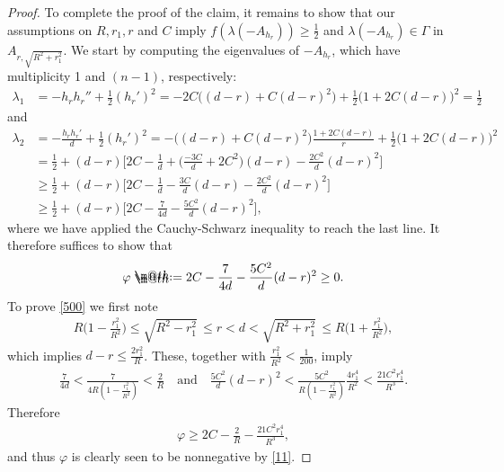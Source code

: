 \documentclass[12pt]{article}
\makeatletter
\numberwithin{equation}{section}
\theoremstyle{plain}
\theoremstyle{definition}
\renewcommand{\phi}{\varphi}
\newcommand*{\defeq}{\mathrel{\rlap{%
			\raisebox{0.3ex}{$\m@th\cdot$}}%
		\raisebox{-0.3ex}{$\m@th\cdot$}}%
	=}
\makeatother
\begin{document}
\begin{proof}
	To complete the proof of the claim, it remains to show that our assumptions on $R, r_1, r$ and $C$ imply $f(\lambda(-A_{h_{r}})) \geq \frac{1}{2}$ and $\lambda(-A_{h_{r}})\in\Gamma$ in $A_{r, \sqrt{R^2 + r_1^2}}$. We start by computing the eigenvalues of $-A_{h_{r}}$, which have multiplicity 1 and $(n-1)$, respectively: 
	\begin{align*}
	\lambda_1 & = -h_{r}h_{r}'' + \frac{1}{2}(h_{r}')^2 = -2C\big((d-r) + C(d-r)^2\big) + \frac{1}{2}\big(1+2C(d-r)\big)^2 = \frac{1}{2}
	\end{align*}
	and
	\begin{align*}
	\lambda_2 & = -\frac{h_{r}h_{r}'}{d} + \frac{1}{2}(h_{r}')^2   = -\big((d-r) + C(d-r)^2\big)\frac{1+2C(d-r)}{r}+ \frac{1}{2}\big(1+2C(d-r)\big)^2 \nonumber \\
	& = \frac{1}{2} + (d-r)\bigg[2C -\frac{1}{d} + \Big(\frac{-3C}{d} + 2C^2\Big)(d-r) - \frac{2C^2}{d}(d-r)^2\bigg] \nonumber \\
	& \geq \frac{1}{2} + (d-r)\bigg[2C -\frac{1}{d} -\frac{3C}{d}(d-r) - \frac{2C^2}{d}(d-r)^2\bigg] \nonumber \\
	& \geq \frac{1}{2} + (d-r)\bigg[2C -\frac{7}{4d} - \frac{5C^2}{d}(d-r)^2\bigg],
	\end{align*}
	where we have applied the Cauchy-Schwarz inequality to reach the last line. It therefore suffices to show that
	\begin{align}\label{500}
	\phi \defeq 2C -\frac{7}{4d} - \frac{5C^2}{d}(d-r)^2  \geq 0. 
	\end{align} 
	To prove \eqref{500} we first note
	\begin{align*}
	R\bigg(1-\frac{r_1^2}{R^2}\bigg) \leq \sqrt{R^2 - r_1^2}\, \leq r < d < \sqrt{R^2 + r_1^2} \, \leq R\bigg(1+\frac{r_1^2}{R^2}\bigg),
	\end{align*} 
	which implies $d-r \leq \frac{2r_1^2}{R}$. These, together with $\frac{r_1^2}{R^2} < \frac{1}{200}$, imply
	\begin{align*}
	\frac{7}{4d} < \frac{7}{4R(1-\frac{r_1^2}{R^2})} < \frac{2}{R} \quad \text{and}\quad 	\frac{5C^2}{d}(d-r)^2 < \frac{5C^2}{R(1-\frac{r_1^2}{R^2})}\frac{4r_1^4}{R^2} < \frac{21C^2 r_1^4}{R^3}. 
	\end{align*}
	Therefore 
	\begin{align*}
	\phi \geq 2C - \frac{2}{R} - \frac{21C^2 r_1^4}{R^3},
	\end{align*}
	and thus $\phi$ is clearly seen to be nonnegative by \eqref{11}. 
\end{proof}
\end{document}
